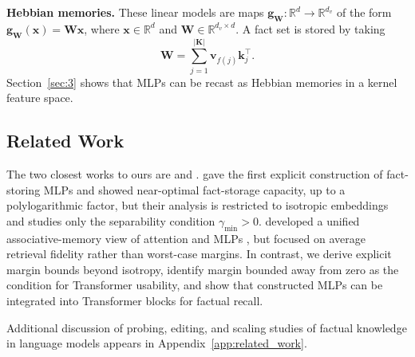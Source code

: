 \textbf{Hebbian memories.} These linear models are maps $\mathbf{g}_{\mathbf{W}}:\mathbb{R}^d\to\mathbb{R}^{d_v}$ of the form $\mathbf{g}_{\mathbf{W}}(\mathbf{x})=\mathbf{W}\mathbf{x}$, where $\mathbf{x}\in\mathbb{R}^d$ and $\mathbf{W}\in\mathbb{R}^{d_{v}\times d}$. A fact set is stored by taking
\begin{equation}
\label{eq:hebbian-memory-class}
\mathbf{W}=\sum_{j=1}^{|\mathbf{K}|}\mathbf{v}_{f(j)}\mathbf{k}_{j}^\top.
\end{equation}
Section~\ref{sec:3} shows that MLPs can be recast as Hebbian memories in a kernel feature space.


\subsection{Related Work}
\label{sec:related_work}

The two closest works to ours are \citet{nichani2024understandingfactualrecalltransformers} and \citet{zhong2025understandingtransformerperspectiveassociative}. \citet{nichani2024understandingfactualrecalltransformers} gave the first explicit construction of fact-storing MLPs and showed near-optimal fact-storage capacity, up to a polylogarithmic factor, but their analysis is restricted to isotropic embeddings and studies only the separability condition $\gamma_{\min}>0$. \citet{zhong2025understandingtransformerperspectiveassociative} developed a unified associative-memory view of attention and MLPs
, but focused on average retrieval fidelity rather than worst-case margins. In contrast, we derive explicit margin bounds beyond isotropy, identify margin bounded away from zero as the condition for Transformer usability, and show that constructed MLPs can be integrated into Transformer blocks for factual recall.

Additional discussion of probing, editing, and scaling studies of factual knowledge in language models appears in Appendix~\ref{app:related_work}.
